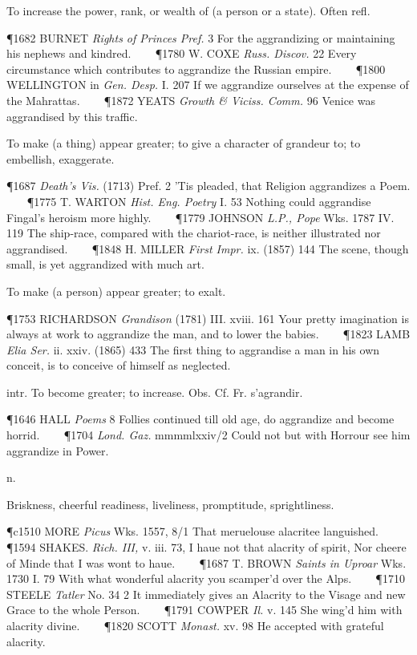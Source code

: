 \begin{description}[wide, labelwidth=!, labelindent=0pt]
\begin{myenumerate}
 To increase the power, rank, or wealth of (a person or a state). Often refl. 

\P 1682 BURNET \textit{Rights of Princes Pref.} 3 For the aggrandizing or maintaining his nephews and kindred.    
\P 1780 W. COXE \textit{Russ. Discov.} 22 Every circumstance which contributes to aggrandize the Russian empire.    
\P 1800 WELLINGTON in \textit{Gen. Desp.} I. 207 If we aggrandize ourselves at the expense of the Mahrattas.    
\P 1872 YEATS \textit{Growth \& Viciss. Comm.} 96 Venice was aggrandised by this traffic.

 To make (a thing) appear greater; to give a character of grandeur to; to embellish, exaggerate. 

\P 1687 \textit{Death's Vis.} (1713) Pref. 2 'Tis pleaded, that Religion aggrandizes a Poem.    
\P 1775 T. WARTON \textit{Hist. Eng. Poetry} I. 53 Nothing could aggrandise Fingal's heroism more highly.    
\P 1779 JOHNSON \textit{L.P., Pope} Wks. 1787 IV. 119 The ship-race, compared with the chariot-race, is neither illustrated nor aggrandised.    
\P 1848 H. MILLER \textit{First Impr.} ix. (1857) 144 The scene, though small, is yet aggrandized with much art.

 To make (a person) appear greater; to exalt. 

\P 1753 RICHARDSON \textit{Grandison} (1781) III. xviii. 161 Your pretty imagination is always at work to aggrandize the man, and to lower the babies.    
\P 1823 LAMB \textit{Elia Ser.} ii. xxiv. (1865) 433 The first thing to aggrandise a man in his own conceit, is to conceive of himself as neglected.

 intr. To become greater; to increase. Obs. Cf. Fr. s'agrandir. 

\P 1646 HALL \textit{Poems} 8 Follies continued till old age, do aggrandize and become horrid.    
\P 1704 \textit{Lond. Gaz.} mmmmlxxiv/2 Could not but with Horrour see him aggrandize in Power.
\end{myenumerate}

 n. 

\noindent  {}


\noindent  
Briskness, cheerful readiness, liveliness, promptitude, sprightliness. 

\P c1510 MORE \textit{Picus} Wks. 1557, 8/1 That meruelouse alacritee languished.    
\P 1594 SHAKES. \textit{Rich. III,} v. iii. 73, I haue not that alacrity of spirit, Nor cheere of Minde that I was wont to haue.    
\P 1687 T. BROWN \textit{Saints in Uproar} Wks. 1730 I. 79 With what wonderful alacrity you scamper'd over the Alps.    
\P 1710 STEELE \textit{Tatler} No. 34 2 It immediately gives an Alacrity to the Visage and new Grace to the whole Person.    
\P 1791 COWPER \textit{Il.} v. 145 She wing'd him with alacrity divine.    
\P 1820 SCOTT \textit{Monast.} xv. 98 He accepted with grateful alacrity.


\end{description}

